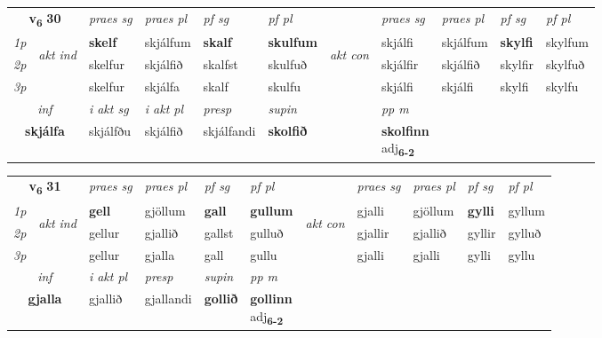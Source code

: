 \noindent
\begin{tabular}{lllllllllll} \toprule
\multicolumn{2}{c}{\textbf{v{\textsubscript{6}}} \Large{\textbf{30}}}  &  \textit{praes sg}  & \textit{praes pl}  &\textit{ pf sg} & \textit{pf pl} &  &  \textit{praes sg}  & \textit{praes pl}  & \textit{pf sg} & \textit{pf pl } \\*
	\cmidrule{3-6} \cmidrule{8-11}
 {\textit{1p}} & \multirow{3}{*}{\begin{turn}{90}\textit{akt ind}\end{turn}} & \textbf{skelf} & skjálfum & \textbf{skalf} & \textbf{skulfum} & \multirow{3}{*}{\begin{turn}{90}\textit{akt con}\end{turn}} &skjálfi & skjálfum & \textbf{skylfi} & skylfum\\*
 {\textit{2p}} &  &  skelfur  & skjálfið & skalfst & skulfuð & & skjálfir & skjálfið & skylfir & skylfuð \\*
{\textit{3p}} &  & skelfur & skjálfa & skalf & skulfu & & skjálfi & skjálfi& skylfi & skylfu \\*
\cmidrule{3-6} \cmidrule{8-11}

   \multicolumn{2}{c}{\textit{inf}}  & \textit{i akt sg} & \textit{i akt pl}   & \textit{presp} & \textit{supin}  && \textit{pp m} \\*
  \multicolumn{2}{c}{\textbf{skjálfa}} & skjálfðu  & skjálfið   & skjálfandi &  \textbf{skolfið}  && \specialcell{\textbf{skolfinn} \\ adj\textbf{\textsubscript{6-2}}} \\*
\end{tabular}

\noindent
\begin{tabular}{lllllllllll} \toprule
\multicolumn{2}{c}{\textbf{v{\textsubscript{6}}} \Large{\textbf{31}}}  &  \textit{praes sg}  & \textit{praes pl}  &\textit{ pf sg} & \textit{pf pl} &  &  \textit{praes sg}  & \textit{praes pl}  & \textit{pf sg} & \textit{pf pl } \\*
	\cmidrule{3-6} \cmidrule{8-11}
 {\textit{1p}} & \multirow{3}{*}{\begin{turn}{90}\textit{akt ind}\end{turn}} & \textbf{gell} & gjöllum & \textbf{gall} & \textbf{gullum} & \multirow{3}{*}{\begin{turn}{90}\textit{akt con}\end{turn}} &gjalli & gjöllum & \textbf{gylli} & gyllum\\*
 {\textit{2p}} &  &  gellur  & gjallið & gallst & gulluð & & gjallir & gjallið & gyllir & gylluð \\*
{\textit{3p}} &  & gellur & gjalla & gall & gullu & & gjalli & gjalli& gylli & gyllu \\*
\cmidrule{3-6} \cmidrule{8-11}

   \multicolumn{2}{c}{\textit{inf}}  & \textit{i akt pl}   & \textit{presp} & \textit{supin}  & \textit{pp m} \\*
  \multicolumn{2}{c}{\textbf{gjalla}}   & gjallið   & gjallandi &  \textbf{gollið}  & \specialcell{\textbf{gollinn} \\ adj\textbf{\textsubscript{6-2}}} \\*
\end{tabular}

